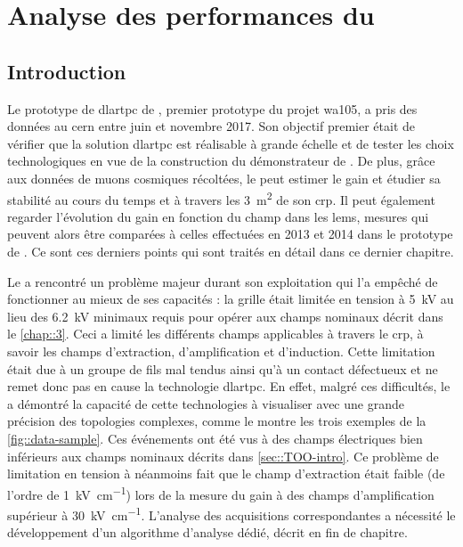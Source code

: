 \chapter{Analyse des performances du \texorpdfstring{\TOO{}}{3x1x1\;m3}}\label{chap::5}
    
  \section{Introduction}
    Le prototype de \gls{dlartpc} de \TOO{}, premier prototype du projet \gls{wa105}, a pris des données au \gls{cern} entre juin et novembre 2017. Son objectif premier était de vérifier que la solution \gls{dlartpc} est réalisable à grande échelle et de tester les choix technologiques en vue de la construction du démonstrateur de \SSS{}. De plus, grâce aux données de muons cosmiques récoltées, le \TOO{} peut estimer le gain et étudier sa stabilité au cours du temps et à travers les \SI{3}{\meter\squared} de son \gls{crp}. Il peut également regarder l'évolution du gain en fonction du champ dans les \glspl{lem}, mesures qui peuvent alors être comparées à celles effectuées en 2013 et 2014 dans le prototype de \threeL{}\cite{Cantini2014}. Ce sont ces derniers points qui sont traités en détail dans ce dernier chapitre.

    Le \TOO{} a rencontré un problème majeur durant son exploitation qui l'a empêché de fonctionner au mieux de ses capacités : la grille était limitée en tension à \SI{5}{\kilo\volt} au lieu des \SI{6.2}{\kilo\volt} minimaux requis pour opérer aux champs nominaux décrit dans le \autoref{chap::3}. Ceci a limité les différents champs applicables à travers le \gls{crp}, à savoir les champs d'extraction, d'amplification et d'induction. Cette limitation était due à un groupe de fils mal tendus ainsi qu'à un contact défectueux et ne remet donc pas en cause la technologie \gls{dlartpc}. En effet, malgré ces difficultés, le \TOO{} a démontré la capacité de cette technologies à visualiser avec une grande précision des topologies complexes, comme le montre les trois exemples de la \autoref{fig::data-sample}. Ces événements ont été vus à des champs électriques bien inférieurs aux champs nominaux décrits dans \autoref{sec::TOO-intro}. Ce problème de limitation en tension à néanmoins fait que le champ d'extraction était faible (de l'ordre de \SI{1}{\kilo\volt\per\centi\meter}) lors de la mesure du gain à des champs d'amplification supérieur à \SI{30}{\kilo\volt\per\centi\meter}. L'analyse des acquisitions correspondantes a nécessité le développement d'un algorithme d'analyse dédié, décrit en fin de chapitre.


